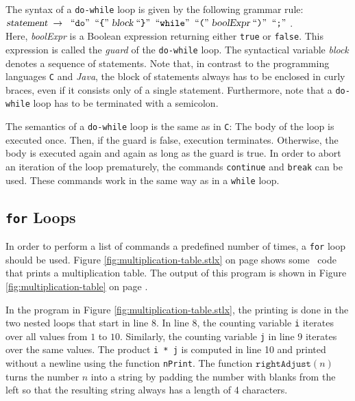 \noindent
The syntax of a \texttt{do-while} loop is given by the following grammar rule:
\\[0.2cm]
\hspace*{1.3cm}
$\textsl{statement} \;\rightarrow\; \;\mbox{``\texttt{do}''}\; \;\mbox{``\texttt{\{}''}\;  \textsl{block} \;\mbox{``\texttt{\}}''}\; \;\mbox{``\texttt{while}''}\;
  \;\mbox{``\texttt{(}''}\; \textsl{boolExpr} \;\mbox{``\texttt{)}''}\; \;\mbox{``\texttt{;}''}\; 
$.
\\[0.2cm]
Here, \textsl{boolExpr} is a Boolean expression returning either \texttt{true} or
\texttt{false}.  This expression is called the \emph{guard} of the \texttt{do-while} loop.
The syntactical variable \textsl{block} denotes a sequence of statements.  Note that, 
in contrast to the programming languages \texttt{C} and \textsl{Java}, the
block of statements always has to be enclosed in curly braces, even if it consists only of a
single statement.  Furthermore, note that a \texttt{do-while} loop has to be terminated with a semicolon.

The semantics of a \texttt{do-while} loop is the same as in \texttt{C}:
The body of the loop is executed once.  Then, if the guard is false, execution terminates.  Otherwise,
the body is executed again and again as long as the guard is true.  In order
to abort an iteration of the loop prematurely, the commands \texttt{continue} and
\texttt{break} can be used.  These commands work in the same way as in a \texttt{while} loop.

\subsection{\texttt{for} Loops}
In order to perform a list of commands a predefined number of times, a \texttt{for} loop should  be
used.  Figure \ref{fig:multiplication-table.stlx} on page \pageref{fig:multiplication-table.stlx}
shows some \setlx\ code that prints a multiplication table.  The output of this program is
shown in Figure \ref{fig:multiplication-table} on page \pageref{fig:multiplication-table}.

In the program in Figure \ref{fig:multiplication-table.stlx}, the printing is done in the two nested
loops that start in line 8.  In line 8, the counting variable \texttt{i} iterates over all values
from $1$ to $10$.  Similarly, the counting variable \texttt{j} in line 9 iterates over the same values.
The product \texttt{i * j} is computed in line 10 and printed without a newline using the
function \texttt{nPrint}.
The function $\texttt{rightAdjust}(n)$ turns the number $n$ into a string by padding the
number with blanks from the left so that the resulting string always has a length of 4 
characters.

